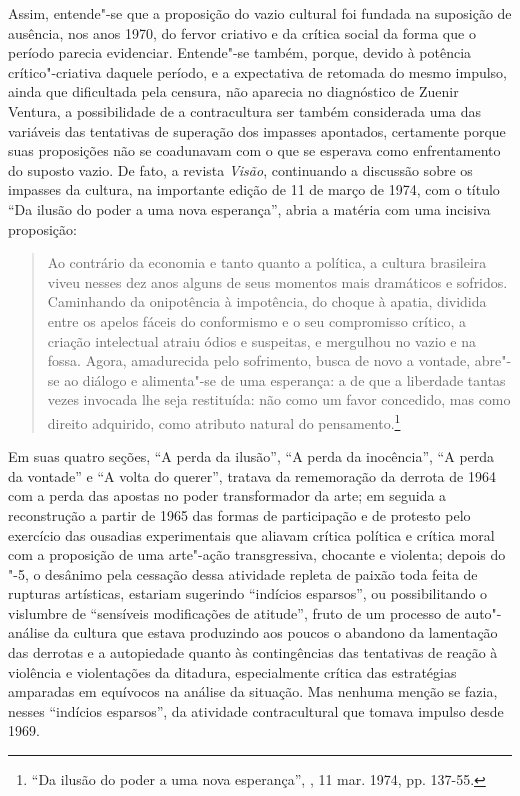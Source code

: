 Assim, entende"-se que a proposição do vazio cultural foi fundada na
suposição de ausência, nos anos 1970, do fervor criativo e da crítica
social da forma que o período parecia evidenciar. Entende"-se também,
porque, devido à potência crítico"-criativa daquele período, e a
expectativa de retomada do mesmo impulso, ainda que dificultada pela
censura, não aparecia no diagnóstico de Zuenir Ventura, a
possibilidade de a contracultura ser também considerada uma das
variáveis das tentativas de superação dos impasses apontados, certamente
porque suas proposições não se coadunavam com o que se esperava como
enfrentamento do suposto vazio. De fato, a revista \emph{Visão},
continuando a discussão sobre os impasses da cultura, na importante
edição de 11 de março de 1974, com o título ``Da ilusão do poder a uma
nova esperança'', abria a matéria com uma incisiva proposição:

\begin{quote}
Ao contrário da economia e tanto quanto a política, a cultura brasileira
viveu nesses dez anos alguns de seus momentos mais dramáticos e
sofridos. Caminhando da onipotência à impotência, do choque à apatia,
dividida entre os apelos fáceis do conformismo e o seu compromisso
crítico, a criação intelectual atraiu ódios e suspeitas, e mergulhou no
vazio e na fossa. Agora, amadurecida pelo sofrimento, busca de novo a
vontade, abre"-se ao diálogo e alimenta"-se de uma esperança: a de que a
liberdade tantas vezes invocada lhe seja restituída: não como um favor
concedido, mas como direito adquirido, como atributo natural do
pensamento.\footnote{``Da ilusão do poder a uma nova esperança'',
  {}, 11 mar. 1974, pp. 137-55.}
\end{quote}

Em suas quatro seções, ``A perda da ilusão'', ``A perda da inocência'',
``A perda da vontade'' e ``A volta do querer'', tratava da rememoração
da derrota de 1964 com a perda das apostas no poder transformador da
arte; em seguida a reconstrução a partir de 1965 das formas de
participação e de protesto pelo exercício das ousadias experimentais que
aliavam crítica política e crítica moral com a proposição de uma
arte"-ação transgressiva, chocante e violenta; depois do "-5, o desânimo
pela cessação dessa atividade repleta de paixão toda feita de rupturas
artísticas, estariam sugerindo ``indícios esparsos'', ou possibilitando
o vislumbre de ``sensíveis modificações de atitude'', fruto de um
processo de auto"-análise da cultura que estava produzindo aos poucos o
abandono da lamentação das derrotas e a autopiedade quanto às
contingências das tentativas de reação à violência e violentações da
ditadura, especialmente crítica das estratégias amparadas em equívocos
na análise da situação. Mas nenhuma menção se fazia, nesses ``indícios
esparsos'', da atividade contracultural que tomava impulso desde 1969.

